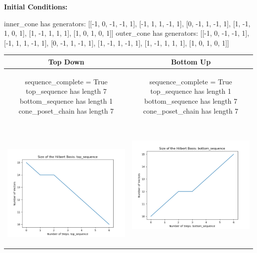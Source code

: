 \documentclass[10pt]{article}
\begin{document}
\textbf{Initial Conditions:}
\begin{SAGE}
inner_cone has generators: 
[[-1, 0, -1, -1, 1], [-1, 1, 1, -1, 1], [0, -1, 1, -1, 1], [1, -1, 1, 0, 1], [1, -1, 1, 1, 1], [1, 0, 1, 0, 1]]
outer_cone has generators: 
[[-1, 0, -1, -1, 1], [-1, 1, 1, -1, 1], [0, -1, 1, -1, 1], [1, -1, 1, -1, 1], [1, -1, 1, 1, 1], [1, 0, 1, 0, 1]]

\end{SAGE}
\begin{tabular}{c|c}
\textbf{Top Down} & \textbf{Bottom Up} \\ \hline  
\begin{SAGE}
	sequence_complete = True
	top_sequence has length 7
	bottom_sequence has length 1
	cone_poset_chain has length 7
\end{SAGE} 
&
\begin{SAGE}
	sequence_complete = True
	top_sequence has length 1
	bottom_sequence has length 7
	cone_poset_chain has length 7
\end{SAGE} 
\\ \hline
\
\begin{minipage}{.45\textwidth}
\includegraphics[width=\textwidth]{"DATA/5d/6 generators 1 bound I/top_sequence SIZE"}
\end{minipage} &
\begin{minipage}{.45\textwidth}
\includegraphics[width=\textwidth]{"DATA/5d/6 generators 1 bound I bottomup/bottom_sequence SIZE"}

\end{minipage}
\end{tabular}
\end{document}
